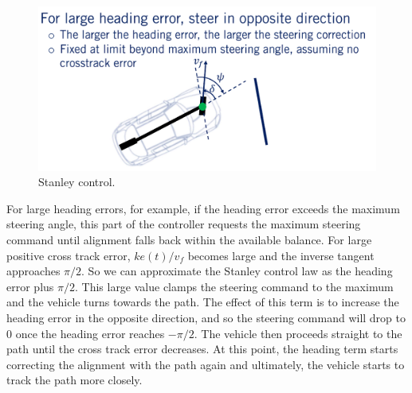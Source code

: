 \begin{figure}[!htb]
\begin{center}
\includegraphics[scale=0.280]{img/lateral_control/stanley_control_2.jpeg}
\end{center}
\caption{Stanley control.}
\label{stanley_control_2}
\end{figure}

For large heading errors, for example, if the heading error exceeds the maximum steering angle, this part of the controller requests the maximum steering command until alignment falls back within the available balance. For large positive cross track error, $ke(t)/v_f$ becomes large and the inverse tangent approaches $\pi/2$. So we can approximate the Stanley control law as the heading error plus $\pi/2$. This large value clamps the steering command to the maximum and the vehicle turns towards the path. The effect of this term is to increase the heading error in the opposite direction, and so the steering command will drop to 0 once the heading error reaches $-\pi/2$. 
The vehicle then proceeds straight to the path until the cross track error decreases. At this point, the heading term starts correcting the alignment with the path again and ultimately, the vehicle starts to track the path more closely. 

